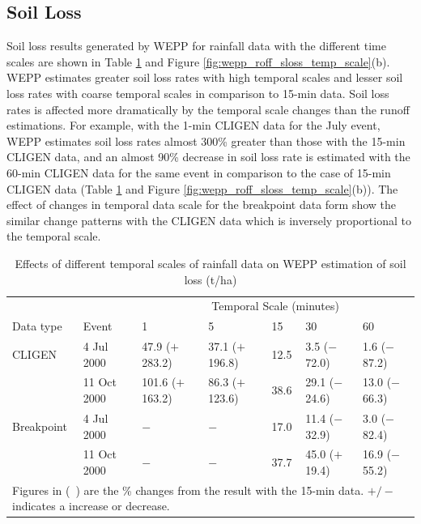 \subsection{Soil Loss}
\label{sec:TemporalScalesSimulatedSoilLoss}

Soil loss results generated by WEPP for rainfall data with the different time
scales are shown in Table
\ref{tab:DifferentTemporalScalesOfRainfallDataOnWEPPSoilLossEstimation} and
Figure \ref{fig:wepp_roff_sloss_temp_scale}(b). WEPP estimates greater soil loss
rates with high temporal scales and lesser soil loss rates with coarse temporal
scales in comparison to 15-min data.
Soil loss rates is affected more dramatically by the temporal scale changes
than the runoff estimations. For example, with the 1-min CLIGEN
data for the July event, WEPP estimates soil loss rates almost 300\%
greater than those with the 15-min CLIGEN data, and an almost 90\% decrease in
soil loss rate is estimated with the 60-min CLIGEN data for the same event in
comparison to the case of 15-min CLIGEN data (Table
\ref{tab:DifferentTemporalScalesOfRainfallDataOnWEPPSoilLossEstimation} and
Figure \ref{fig:wepp_roff_sloss_temp_scale}(b)). The effect of changes in
temporal data scale for the breakpoint data form show the similar change
patterns with the CLIGEN data which is inversely proportional to the temporal
scale.

\begin{table}[htbp]
  \centering
  \footnotesize
  \caption[Effects of different temporal scales of rainfall data on WEPP
estimation of soil loss]{Effects of different temporal scales of rainfall data
on WEPP estimation of soil loss (t/ha)}
  \label{tab:DifferentTemporalScalesOfRainfallDataOnWEPPSoilLossEstimation}
    \begin{tabular}{lllllll}
    \toprule
    & & \multicolumn{5}{c}{Temporal Scale (minutes)}\\
      \cmidrule{3-7}
    Data type & Event & 1 & 5 & 15 & 30 & 60 \\
    \midrule
    CLIGEN & 4 Jul 2000 & 47.9 ($+$283.2) & 37.1 ($+$196.8) & 12.5 & 3.5
($-$72.0) & 1.6 ($-$87.2) \\
     & 11 Oct 2000 & 101.6 ($+$163.2) & 86.3 ($+$123.6) & 38.6 & 29.1 ($-$24.6)
& 13.0 ($-$66.3) \\
     \midrule
    Breakpoint & 4 Jul 2000 & $-$ & $-$ & 17.0 & 11.4 ($-$32.9) & 3.0 ($-$82.4)
\\
     & 11 Oct 2000 & $-$ & $-$ & 37.7 & 45.0 ($+$19.4) & 16.9 ($-$55.2) \\
    \bottomrule
    \multicolumn{7}{p{13cm}}{\footnotesize Figures in (\ ) are the \% changes
from the result with the 15-min data. $+/-$ indicates a increase or decrease.}\\
    \end{tabular}
\end{table}

